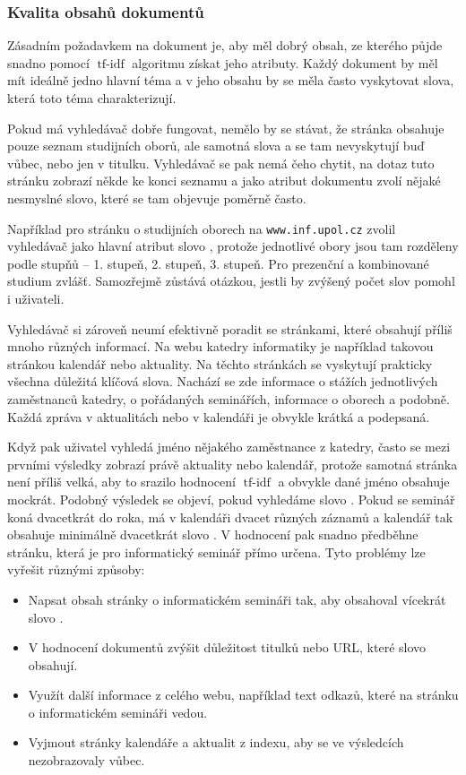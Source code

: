 \documentclass[12pt]{article}
\newcommand{\code}[1]{\texttt{#1}}
\newcommand{\sssection}[1]{\subsubsection{#1}}
\DeclareMathOperator{\tfidf}{tf-idf}
\begin{document}
\sssection{Kvalita obsahů dokumentů}\label{ch.kvalita}
Zásadním požadavkem na dokument je, aby měl dobrý obsah, ze kterého půjde snadno pomocí $\tfidf$ algoritmu získat jeho atributy. Každý dokument by měl mít ideálně jedno hlavní téma a v jeho obsahu by se měla často vyskytovat slova, která toto téma charakterizují. 

Pokud má vyhledávač dobře fungovat, nemělo by se stávat, že stránka  obsahuje pouze seznam studijních oborů, ale samotná slova  a  se tam nevyskytují buď vůbec, nebo jen v titulku. Vyhledávač se pak nemá čeho chytit, na dotaz  tuto stránku zobrazí někde ke konci seznamu a jako atribut dokumentu zvolí nějaké nesmyslné slovo, které se tam objevuje poměrně často. 

Například pro stránku o studijních oborech na \code{www.inf.upol.cz} zvolil vyhledávač jako hlavní atribut slovo , protože jednotlivé obory jsou tam rozděleny podle stupňů -- 1. stupeň, 2. stupeň, 3. stupeň. Pro prezenční a kombinované studium zvlášť. Samozřejmě zůstává otázkou, jestli by zvýšený počet slov  pomohl i uživateli. 

Vyhledávač si zároveň neumí efektivně poradit se stránkami, které obsahují příliš mnoho různých informací. Na webu katedry informatiky je například takovou stránkou kalendář nebo aktuality. Na těchto stránkách se vyskytují prakticky všechna důležitá klíčová slova. Nachází se zde informace o stážích jednotlivých zaměstnanců katedry, o pořádaných seminářích, informace o oborech a podobně. Každá zpráva v aktualitách nebo v kalendáři je obvykle krátká a podepsaná. 

Když pak uživatel vyhledá jméno nějakého zaměstnance z katedry, často se mezi prvními výsledky zobrazí právě aktuality nebo kalendář, protože samotná stránka není příliš velká, aby to srazilo hodnocení $\tfidf$ a obvykle dané jméno obsahuje mockrát. Podobný výsledek se objeví, pokud vyhledáme slovo . Pokud se seminář koná dvacetkrát do roka, má v kalendáři dvacet různých záznamů a kalendář tak obsahuje minimálně dvacetkrát slovo . V hodnocení pak snadno předběhne stránku, která je pro informatický seminář přímo určena. Tyto problémy lze vyřešit různými způsoby:

\begin{itemize}
	\item Napsat obsah stránky o informatickém semináři tak, aby obsahoval vícekrát slovo .
	\item V hodnocení dokumentů zvýšit důležitost titulků nebo URL, které slovo  obsahují. 
	\item Využít další informace z celého webu, například text odkazů, které na stránku o informatickém semináři vedou. 
	\item Vyjmout stránky kalendáře a aktualit z indexu, aby se ve výsledcích nezobrazovaly vůbec.
\end{itemize}
\end{document}
